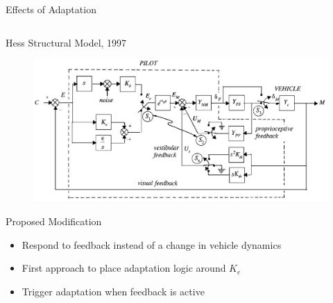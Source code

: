\documentclass[10pt]{beamer}
\begin{document}
\begin{frame}[fragile]{Effects of Adaptation}
\begin{columns}[T]
\begin{column}{\textwidth}
    \end{column}
  \end{columns}
\end{frame}

\begin{frame}[fragile]{Hess Structural Model, 1997~\cite{Hess1997}}
  \begin{figure}[h!]
    \begin{center}
      \includegraphics[width=\linewidth]{../img/Screen_Shot_2018-07-31_at_11.21.44_AM.png}
    \end{center}
  \end{figure}
\end{frame}

\begin{frame}[fragile]{Proposed Modification}
  \begin{itemize}
    \setlength\itemsep{1em}
    \item Respond to feedback instead of a change in vehicle dynamics
    \item First approach to place adaptation logic around $K_e$
    \item Trigger adaptation when feedback is active
  \end{itemize}
\end{frame}
\end{document}
